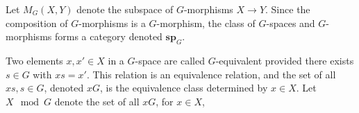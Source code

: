 Let $M_G(X, Y)$ denote the subspace of $G$-morphisms $X \rightarrow Y$. Since the composition of $G$-morphisms is a $G$-morphism, the class of $G$-spaces and $G$-morphisms forms a category denoted $\mathbf{sp}_G$.

Two elements $x, x' \in X$ in a $G$-space are called $G$-equivalent provided there exists $s \in G$ with $xs = x'$. This relation is an equivalence relation, and the set of all $xs, s \in G$, denoted $xG$, is the equivalence class determined by $x \in X$. Let $X \mod G$ denote the set of all $xG$, for $x \in X$,

